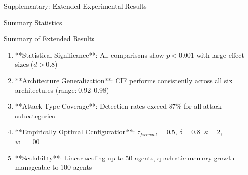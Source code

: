 \documentclass[
  ignorenonframetext,
]{beamer}
\begin{document}
\begin{frame}[fragile]{Supplementary: Extended Experimental Results}
\begin{block}{Summary Statistics}
\begin{block}{Summary of Extended Results}
\protect{}\label{sec:extended-key-findings}
\begin{enumerate}
\item **Statistical Significance**: All comparisons show $p < 0.001$ with large effect sizes ($d > 0.8$)
\item **Architecture Generalization**: CIF performs consistently across all six architectures (range: 0.92--0.98)
\item **Attack Type Coverage**: Detection rates exceed 87\% for all attack subcategories
\item **Empirically Optimal Configuration**: $\tau_{firewall} = 0.5$, $\delta = 0.8$, $\kappa = 2$, $w = 100$
\item **Scalability**: Linear scaling up to 50 agents, quadratic memory growth manageable to 100 agents
\end{enumerate}
\end{block}
\end{block}
\end{frame}
\end{document}
